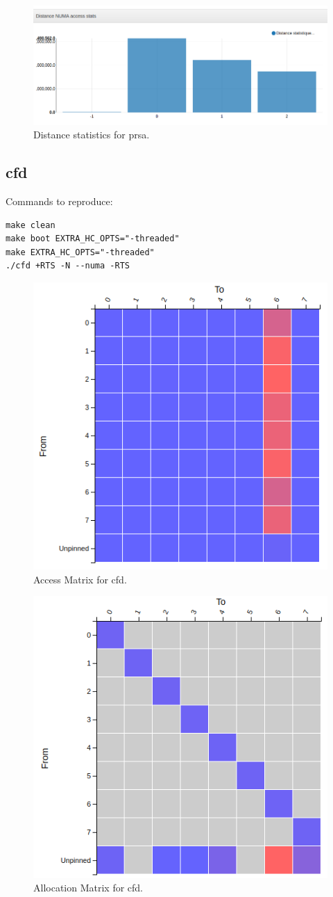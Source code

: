 \documentclass[a4paper,11pt]{article}
\begin{document}
\begin{figure}[!htb]
    \centering
    \includegraphics[width=\linewidth]{TechMemo/results/prsa/prsa_distance.png}
    \caption{Distance statistics for prsa.}
    \label{fig:prsa_distance}
\end{figure}

\subsection{cfd}

Commands to reproduce:
\begin{lstlisting}
make clean
make boot EXTRA_HC_OPTS="-threaded"
make EXTRA_HC_OPTS="-threaded"
./cfd +RTS -N --numa -RTS
\end{lstlisting}

\begin{figure}[!htb]
    \centering
    \includegraphics[width=0.5\linewidth]{TechMemo/results/cfd/cfd_access.png}
    \caption{Access Matrix for cfd.}
    \label{fig:cd_access_matrix}
\end{figure}

\begin{figure}[!htb]
    \centering
    \includegraphics[width=0.5\linewidth]{TechMemo/results/cfd/alloc_Cfd.png}
    \caption{Allocation Matrix for cfd.}
    \label{fig:cfd_alloc_matrix}
\end{figure}
\end{document}
